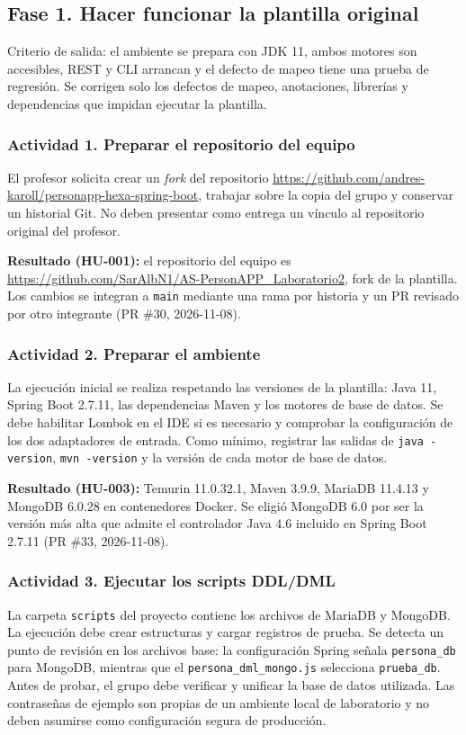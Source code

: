 \documentclass[11pt,a4paper]{article}
\begin{document}
\subsection{Fase 1. Hacer funcionar la plantilla original}
Criterio de salida: el ambiente se prepara con JDK 11, ambos motores son
accesibles, REST y CLI arrancan y el defecto de mapeo tiene una prueba de
regresión. Se corrigen solo los defectos de mapeo, anotaciones, librerías y
dependencias que impidan ejecutar la plantilla.
\subsubsection*{Actividad 1. Preparar el repositorio del equipo}
El profesor solicita crear un \emph{fork} del repositorio
\url{https://github.com/andres-karoll/personapp-hexa-spring-boot},
trabajar sobre la copia del grupo y conservar un historial Git. No deben
presentar como entrega un vínculo al repositorio original del profesor.

\textbf{Resultado (HU-001):} el repositorio del equipo es
\url{https://github.com/SarAlbN1/AS-PersonAPP_Laboratorio2}, fork de la plantilla.
Los cambios se integran a \texttt{main} mediante una rama por historia y un PR
revisado por otro integrante (PR \#30, 2026-11-08).

\subsubsection*{Actividad 2. Preparar el ambiente}
La ejecución inicial se realiza respetando las versiones de la plantilla:
Java 11, Spring Boot 2.7.11, las dependencias Maven y los motores de base
de datos. Se debe habilitar Lombok en el IDE si es necesario y comprobar
la configuración de los dos adaptadores de entrada. Como mínimo,
registrar las salidas de \texttt{java -version}, \texttt{mvn -version} y
la versión de cada motor de base de datos.

\textbf{Resultado (HU-003):} Temurin 11.0.32.1, Maven 3.9.9, MariaDB 11.4.13 y
MongoDB 6.0.28 en contenedores Docker. Se eligió MongoDB 6.0 por ser la versión
más alta que admite el controlador Java 4.6 incluido en Spring Boot 2.7.11
(PR \#33, 2026-11-08).

\subsubsection*{Actividad 3. Ejecutar los scripts DDL/DML}
La carpeta \texttt{scripts} del proyecto contiene los archivos de MariaDB
y MongoDB. La ejecución debe crear estructuras y cargar registros de prueba.
Se detecta un punto de revisión en los archivos base: la configuración
Spring señala \texttt{persona\_db} para MongoDB, mientras que el
\texttt{persona\_dml\_mongo.js} selecciona \texttt{prueba\_db}.
Antes de probar, el grupo debe verificar y unificar la base de datos
utilizada. Las contraseñas de ejemplo son propias de un ambiente local de
laboratorio y no deben asumirse como configuración segura de producción.
\end{document}
